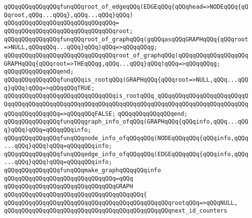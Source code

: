 \verb|qQQqqQQqqQQqqQQqfunqQQqroot_of_edgeqQQq(EDGEqQQq{qQQqhead=>NODEqQQq{qQQqroot,qQQq...qQQq},qQQq...qQQq}qQQq)|\newline
\verb|qQQqqQQqqQQqqQQqqQQqqQQqqQQqqQQq=|\newline
\verb|qQQqqQQqqQQqqQQqqQQqqQQqqQQqqQQqroot;|\newline
\newline
\newline
\verb|qQQqqQQqqQQqqQQqfunqQQqroot_of_graphqQQq(gqQQqasqQQqGRAPHqQQq{qQQqroot=>NULL,qQQqqQQq...qQQq}qQQq)qQQq=>qQQqqQQqg;|\newline
\verb|qQQqqQQqqQQqqQQqqQQqqQQqqQQqqQQqroot_of_graphqQQq(qQQqqQQqqQQqqQQqqQQqGRAPHqQQq{qQQqroot=>THEqQQqg,qQQq...qQQq}qQQq)qQQq=>qQQqqQQqg;|\newline
\verb|qQQqqQQqqQQqqQQqend;|\newline
\newline
\newline
\verb|qQQqqQQqqQQqqQQqfunqQQqis_rootqQQq(GRAPHqQQq{qQQqroot=>NULL,qQQq...qQQq}qQQq)qQQq=>qQQqqQQqTRUE;|\newline
\verb|qQQqqQQqqQQqqQQqqQQqqQQqqQQqqQQqis_rootqQQq_qQQqqQQqqQQqqQQqqQQqqQQqqQQqqQQqqQQqqQQqqQQqqQQqqQQqqQQqqQQqqQQqqQQqqQQqqQQqqQQqqQQqqQQqqQQqqQQqqQQqqQQqqQQqqQQq=>qQQqqQQqFALSE;|\newline
\verb|qQQqqQQqqQQqqQQqend;|\newline
\newline
\newline
\verb|qQQqqQQqqQQqqQQqfunqQQqgraph_info_ofqQQq(GRAPHqQQq{qQQqinfo,qQQq...qQQq}qQQq)qQQq=qQQqqQQqinfo;|\newline
\verb|qQQqqQQqqQQqqQQqfunqQQqnode_info_ofqQQqqQQq(NODEqQQqqQQq{qQQqinfo,qQQq...qQQq}qQQq)qQQq=qQQqqQQqinfo;|\newline
\verb|qQQqqQQqqQQqqQQqfunqQQqedge_info_ofqQQqqQQq(EDGEqQQqqQQq{qQQqinfo,qQQq...qQQq}qQQq)qQQq=qQQqqQQqinfo;|\newline
\newline
\verb|qQQqqQQqqQQqqQQqfunqQQqmake_graphqQQqqQQqinfo|\newline
\verb|qQQqqQQqqQQqqQQqqQQqqQQqqQQqqQQq=qQQq|\newline
\verb|qQQqqQQqqQQqqQQqqQQqqQQqqQQqqQQqGRAPH|\newline
\verb|qQQqqQQqqQQqqQQqqQQqqQQqqQQqqQQqqQQqqQQq{|\newline
\verb|qQQqqQQqqQQqqQQqqQQqqQQqqQQqqQQqqQQqqQQqqQQqqQQqrootqQQq=>qQQqNULL,|\newline
\newline
\verb|qQQqqQQqqQQqqQQqqQQqqQQqqQQqqQQqqQQqqQQqqQQqqQQqnext_id_counters|\newline
